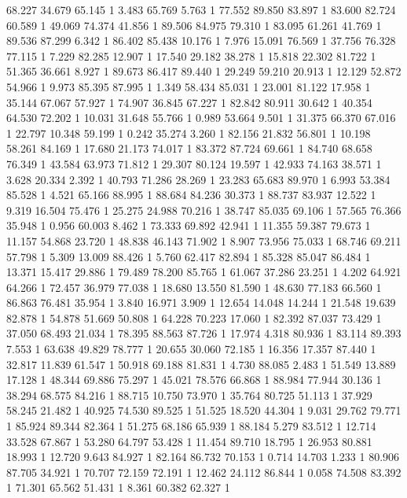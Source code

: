 	68.227	34.679	65.145	1
	3.483	65.769	5.763	1
	77.552	89.850	83.897	1
	83.600	82.724	60.589	1
	49.069	74.374	41.856	1
	89.506	84.975	79.310	1
	83.095	61.261	41.769	1
	89.536	87.299	6.342	1
	86.402	85.438	10.176	1
	7.976	15.091	76.569	1
	37.756	76.328	77.115	1
	7.229	82.285	12.907	1
	17.540	29.182	38.278	1
	15.818	22.302	81.722	1
	51.365	36.661	8.927	1
	89.673	86.417	89.440	1
	29.249	59.210	20.913	1
	12.129	52.872	54.966	1
	9.973	85.395	87.995	1
	1.349	58.434	85.031	1
	23.001	81.122	17.958	1
	35.144	67.067	57.927	1
	74.907	36.845	67.227	1
	82.842	80.911	30.642	1
	40.354	64.530	72.202	1
	10.031	31.648	55.766	1
	0.989	53.664	9.501	1
	31.375	66.370	67.016	1
	22.797	10.348	59.199	1
	0.242	35.274	3.260	1
	82.156	21.832	56.801	1
	10.198	58.261	84.169	1
	17.680	21.173	74.017	1
	83.372	87.724	69.661	1
	84.740	68.658	76.349	1
	43.584	63.973	71.812	1
	29.307	80.124	19.597	1
	42.933	74.163	38.571	1
	3.628	20.334	2.392	1
	40.793	71.286	28.269	1
	23.283	65.683	89.970	1
	6.993	53.384	85.528	1
	4.521	65.166	88.995	1
	88.684	84.236	30.373	1
	88.737	83.937	12.522	1
	9.319	16.504	75.476	1
	25.275	24.988	70.216	1
	38.747	85.035	69.106	1
	57.565	76.366	35.948	1
	0.956	60.003	8.462	1
	73.333	69.892	42.941	1
	11.355	59.387	79.673	1
	11.157	54.868	23.720	1
	48.838	46.143	71.902	1
	8.907	73.956	75.033	1
	68.746	69.211	57.798	1
	5.309	13.009	88.426	1
	5.760	62.417	82.894	1
	85.328	85.047	86.484	1
	13.371	15.417	29.886	1
	79.489	78.200	85.765	1
	61.067	37.286	23.251	1
	4.202	64.921	64.266	1
	72.457	36.979	77.038	1
	18.680	13.550	81.590	1
	48.630	77.183	66.560	1
	86.863	76.481	35.954	1
	3.840	16.971	3.909	1
	12.654	14.048	14.244	1
	21.548	19.639	82.878	1
	54.878	51.669	50.808	1
	64.228	70.223	17.060	1
	82.392	87.037	73.429	1
	37.050	68.493	21.034	1
	78.395	88.563	87.726	1
	17.974	4.318	80.936	1
	83.114	89.393	7.553	1
	63.638	49.829	78.777	1
	20.655	30.060	72.185	1
	16.356	17.357	87.440	1
	32.817	11.839	61.547	1
	50.918	69.188	81.831	1
	4.730	88.085	2.483	1
	51.549	13.889	17.128	1
	48.344	69.886	75.297	1
	45.021	78.576	66.868	1
	88.984	77.944	30.136	1
	38.294	68.575	84.216	1
	88.715	10.750	73.970	1
	35.764	80.725	51.113	1
	37.929	58.245	21.482	1
	40.925	74.530	89.525	1
	51.525	18.520	44.304	1
	9.031	29.762	79.771	1
	85.924	89.344	82.364	1
	51.275	68.186	65.939	1
	88.184	5.279	83.512	1
	12.714	33.528	67.867	1
	53.280	64.797	53.428	1
	11.454	89.710	18.795	1
	26.953	80.881	18.993	1
	12.720	9.643	84.927	1
	82.164	86.732	70.153	1
	0.714	14.703	1.233	1
	80.906	87.705	34.921	1
	70.707	72.159	72.191	1
	12.462	24.112	86.844	1
	0.058	74.508	83.392	1
	71.301	65.562	51.431	1
	8.361	60.382	62.327	1

